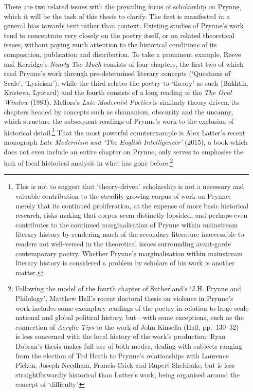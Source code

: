 \documentclass[]{article}
\begin{document}
There are two related issues with the prevailing focus of scholarship on
Prynne, which it will be the task of this thesis to clarify. The first
is manifested in a general bias towards text rather than context.
Existing studies of Prynne's work tend to concentrate very closely on
the poetry itself, or on related theoretical issues, without paying much
attention to the historical conditions of its composition, publication
and distribution. To take a prominent example, Reeve and Kerridge's
\emph{Nearly Too Much} consists of four chapters, the first two of which
read Prynne's work through pre-determined literary concepts (`Questions
of Scale', `Lyricism'), while the third relates the poetry to `theory'
as such (Bakhtin, Kristeva, Lyotard) and the fourth consists of a long
reading of the \emph{The Oval Window} (1983). Mellors's \emph{Late
Modernist Poetics} is similarly theory-driven, its chapters headed by
concepts such as shamanism, obscurity and the uncanny, which structure
the subsequent readings of Prynne's work to the exclusion of historical
detail.\footnote{This is not to suggest that `theory-driven' scholarship
  is not a necessary and valuable contribution to the steadily growing
  corpus of work on Prynne; merely that its continued proliferation, at
  the expense of more basic historical research, risks making that
  corpus seem distinctly lopsided, and perhaps even contributes to the
  continued marginalisation of Prynne within mainstream literary history
  by rendering much of the secondary literature inaccessible to readers
  not well-versed in the theoretical issues surrounding avant-garde
  contemporary poetry. Whether Prynne's marginalisation within
  mainstream literary history is considered a problem by scholars of his
  work is another matter.} That the most powerful counterexample is Alex
Latter's recent monograph \emph{Late Modernism and `The English
Intelligencer'} (2015), a book which does not even include an entire
chapter on Prynne, only serves to emphasise the lack of local historical
analysis in what has gone before.\footnote{Following the model of the
  fourth chapter of Sutherland's `J.H. Prynne and Philology', Matthew
  Hall's recent doctoral thesis on violence in Prynne's work includes
  some exemplary readings of the poetry in relation to large-scale
  national and global political history, but---with some exceptions,
  such as the connection of \emph{Acrylic Tips} to the work of John
  Kinsella (Hall, pp.~130--32)---is less concerned with the local
  history of the work's production. Ryan Dobran's thesis makes full use
  of both modes, dealing with subjects ranging from the election of Ted
  Heath to Prynne's relationships with Laurence Picken, Joseph Needham,
  Francis Crick and Rupert Sheldrake, but is less straightforwardly
  historical than Latter's work, being organised around the concept of
  `difficulty'.}
\end{document}

